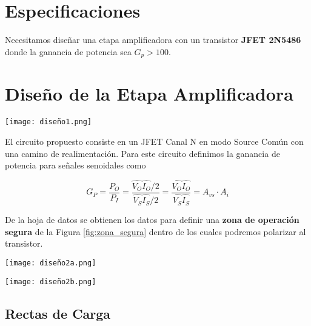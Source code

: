 \documentclass[a4paper, 10pt, spanish]{article}
\begin{document}
\section{Especificaciones}

Necesitamos diseñar una etapa amplificadora con un transistor \textbf{JFET 2N5486} donde la ganancia de potencia sea $G_p > 100$.

\section{Diseño de la Etapa Amplificadora}

\begin{center}
           \texttt{[image: diseño1.png]}
           \label{diseño1}
\end{center}


El circuito propuesto consiste en un JFET Canal N en modo Source Común con una camino de realimentación. Para este circuito definimos la ganancia de potencia para señales senoidales como

\begin{equation}
	G_P = \frac{P_O}{P_I} = \frac{\hat{V_O}\hat{I_O}/2}{\hat{V_S}\hat{I_S}/2} = \frac{\hat{V_O}\hat{I_O}}{\hat{V_S}\hat{I_S}} = A_{vs}\cdot A_{i}
	\end{equation}

De la hoja de datos se obtienen los datos para definir una \textbf{zona de operación segura} de la Figura \ref{fig:zona_segura} dentro de los cuales podremos polarizar al transistor.



\begin{center}
           \texttt{[image: diseño2a.png]}
           \label{fig:zona_segura}
\end{center}

\begin{center}
           \texttt{[image: diseño2b.png]}
           \label{fig:rectas_carga}
\end{center}



\subsection{Rectas de Carga}
\end{document}
